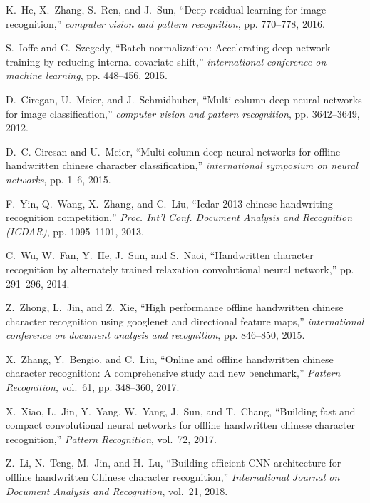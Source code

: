 \documentclass[conference]{IEEEtran}
\begin{document}
\begin{thebibliography}{1}
K.~He, X.~Zhang, S.~Ren, and J.~Sun, ``Deep residual learning for image
recognition,'' \emph{computer vision and pattern recognition}, pp. 770--778,
2016.

S.~Ioffe and C.~Szegedy, ``Batch normalization: Accelerating deep network
training by reducing internal covariate shift,'' \emph{international
	conference on machine learning}, pp. 448--456, 2015.

D.~Ciregan, U.~Meier, and J.~Schmidhuber, ``Multi-column deep neural networks
for image classification,'' \emph{computer vision and pattern recognition},
pp. 3642--3649, 2012.

D.~C. Ciresan and U.~Meier, ``Multi-column deep neural networks for offline
handwritten chinese character classification,'' \emph{international symposium
	on neural networks}, pp. 1--6, 2015.

F.~Yin, Q.~Wang, X.~Zhang, and C.~Liu, ``Icdar 2013 chinese handwriting
recognition competition,'' \emph{Proc. Int’l Conf. Document Analysis and
	Recognition (ICDAR)}, pp. 1095--1101, 2013.

C.~Wu, W.~Fan, Y.~He, J.~Sun, and S.~Naoi, ``Handwritten character recognition
by alternately trained relaxation convolutional neural network,'' pp.
291--296, 2014.

Z.~Zhong, L.~Jin, and Z.~Xie, ``High performance offline handwritten chinese
character recognition using googlenet and directional feature maps,''
\emph{international conference on document analysis and recognition}, pp.
846--850, 2015.

X.~Zhang, Y.~Bengio, and C.~Liu, ``Online and offline handwritten chinese
character recognition: A comprehensive study and new benchmark,''
\emph{Pattern Recognition}, vol.~61, pp. 348--360, 2017.

X.~Xiao, L.~Jin, Y.~Yang, W.~Yang, J.~Sun, and T.~Chang, ``Building fast and
compact convolutional neural networks for offline handwritten chinese
character recognition,'' \emph{Pattern Recognition}, vol.~72, 2017.

Z.~Li, N.~Teng, M.~Jin, and H.~Lu, ``Building efficient CNN architecture for offline handwritten Chinese character recognition,'' \emph{International Journal on Document Analysis and Recognition}, vol.~21, 2018.


\end{thebibliography}
\end{document}
